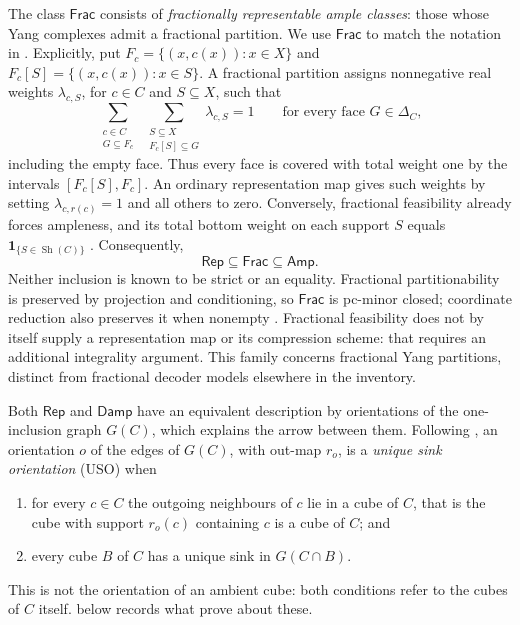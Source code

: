 \documentclass[11pt]{article}
\theoremstyle{definition}
\newcommand{\Amp}{\mathsf{Amp}}
\newcommand{\Damp}{\mathsf{Damp}}
\newcommand{\Rep}{\mathsf{Rep}}
\newcommand{\Frac}{\mathsf{Frac}}
\newcommand{\Sh}{\operatorname{Sh}}
\begin{document}
The class $\Frac$ consists of \emph{fractionally representable ample
classes}: those whose Yang complexes admit a fractional partition. We use
$\Frac$ to match the notation in \cite{Partition}. Explicitly, put
$F_c=\{(x,c(x)):x\in X\}$ and $F_c[S]=\{(x,c(x)):x\in S\}$.
A fractional partition assigns nonnegative real weights $\lambda_{c,S}$,
for $c\in C$ and $S\subseteq X$, such that
\begin{equation}\label{eq:fractional-representation}
 \sum_{\substack{c\in C\\G\subseteq F_c}}
 \ \sum_{\substack{S\subseteq X\\F_c[S]\subseteq G}}
 \lambda_{c,S}=1
 \qquad\text{for every face }G\in\Delta_C,
\end{equation}
including the empty face. Thus every face is covered with total weight one
by the intervals $[F_c[S],F_c]$. An ordinary representation map gives such
weights by setting $\lambda_{c,r(c)}=1$ and all others to zero.
Conversely, fractional feasibility already forces ampleness, and its total
bottom weight on each support $S$ equals $\mathbf1_{\{S\in\Sh(C)\}}$
\cite[Theorem~\textnormal{Fractional partitionability forces ampleness}]{Partition}.
Consequently,
\[
 \Rep\subseteq\Frac\subseteq\Amp.
\]
Neither inclusion is known to be strict or an equality. Fractional
partitionability is preserved by projection and conditioning, so $\Frac$
is pc-minor closed; coordinate reduction also preserves it when nonempty
\cite[Proposition~\textnormal{Fractional partitions descend through projection
and reduction}; Corollary~\textnormal{Pc-minor closure of fractional Yang
partitionability}]{Partition}. Fractional feasibility does not by itself
supply a representation map or its compression scheme: that requires an
additional integrality argument. This family concerns fractional Yang
partitions, distinct from fractional decoder models elsewhere in the inventory.

Both $\Rep$ and $\Damp$ have an equivalent description by orientations of the
one-inclusion graph $G(C)$, which explains the arrow between them. Following
\cite[\S6.2]{CCMW}, an orientation $o$ of the edges of $G(C)$, with out-map
$r_o$, is a \emph{unique sink orientation} (USO) when
\begin{enumerate}\setlength{\itemsep}{0pt}
\item[(C1)] for every $c\in C$ the outgoing neighbours of $c$ lie in a cube of
$C$, that is the cube with support $r_o(c)$ containing $c$ is a cube of $C$; and
\item[(C2)] every cube $B$ of $C$ has a unique sink in $G(C\cap B)$.
\end{enumerate}
This is not the orientation of an ambient cube: both conditions refer to the
cubes of $C$ itself.  below records what \cite{CCMW}
prove about these.
\end{document}
